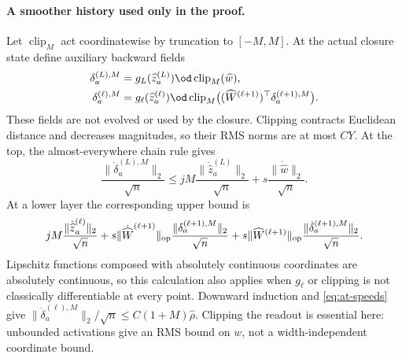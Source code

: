 \paragraph{A smoother history used only in the proof.}
Let $\operatorname{clip}_M$ act coordinatewise by truncation to $[-M,M]$.
At the actual closure state define auxiliary backward fields
\begin{align}
 \delta_{a}^{(L),M}
   &=g_L(\widehat z_a^{(L)})\od\operatorname{clip}_M(\widehat w),\nonumber\\
 \delta_{a}^{(\ell),M}
   &=g_\ell(\widehat z_a^{(\ell)})\od
      \operatorname{clip}_M\bigl((\widehat W^{(\ell+1)})^\top
                                  \delta_a^{(\ell+1),M}\bigr).
 \label{eq:at-proof-clipping}
\end{align}
These fields are not evolved or used by the closure.  Clipping contracts
Euclidean distance and decreases magnitudes, so their RMS norms are at
most $CY$.  At the top, the almost-everywhere chain rule gives
\[
 \frac{\|\dot\delta_a^{(L),M}\|_2}{\sqrt n}
 \le jM\frac{\|\dot{\widehat z}_a^{(L)}\|_2}{\sqrt n}
       +s\frac{\|\dot{\widehat w}\|_2}{\sqrt n}.
\]
At a lower layer the corresponding upper bound is
\[
 jM\frac{\|\dot{\widehat z}_a^{(\ell)}\|_2}{\sqrt n}
 +s\|\dot{\widehat W}^{(\ell+1)}\|_{\rm op}
                \frac{\|\delta_a^{(\ell+1),M}\|_2}{\sqrt n}
 +s\|\widehat W^{(\ell+1)}\|_{\rm op}
                \frac{\|\dot\delta_a^{(\ell+1),M}\|_2}{\sqrt n}.
\]
Lipschitz functions composed with absolutely continuous coordinates are
absolutely continuous, so this calculation also applies when $g_\ell$ or
clipping is not classically differentiable at every point.  Downward
induction and \eqref{eq:at-speeds} give
$\|\dot\delta_a^{(\ell),M}\|_2/\sqrt n\le C(1+M)\widehat\rho$.
Clipping the readout is essential here: unbounded activations give an RMS
bound on $w$, not a width-independent coordinate bound.

